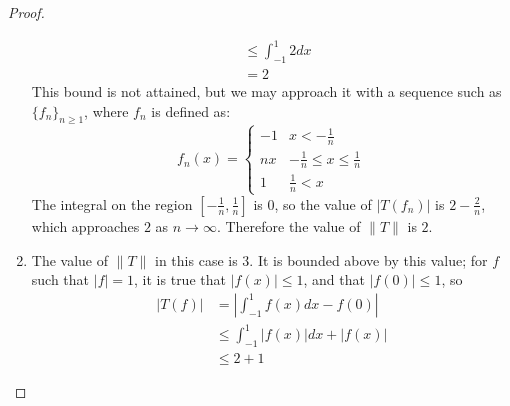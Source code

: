 \documentclass[12pt]{article}
\theoremstyle{definition}
\begin{document}
\begin{proof}
\begin{enumerate}[label=(\roman*)]
\begin{align*}
            &\leq \int_{-1}^1 2dx\\
            &= 2
        \end{align*}
        This bound is not attained, but we may approach it with a sequence such as $\{f_n\}_{n \geq 1}$, where $f_n$ is defined as:
        \[
        f_n(x) = \begin{cases}
        -1 & x < -\frac{1}{n}\\
        nx & -\frac{1}{n} \leq x \leq \frac{1}{n}\\
        1 & \frac{1}{n} < x
        \end{cases}
        \]
	The integral on the region $[-\frac{1}{n}, \frac{1}{n}]$ is $0$, so the value of $\lvert T(f_n) \rvert$ is $2 - \frac{2}{n}$, which approaches $2$ as $n \to \infty$. Therefore the value of $\lVert T \rVert $ is $2$.\
        \item The value of $\lVert T \rVert$ in this case is $3$. It is bounded above by this value; for $f$ such that $\lvert f \rvert = 1$, it is true that $\lvert f(x) \rvert \leq 1$, and that $\lvert f(0) \rvert \leq 1$, so
        \begin{align*}
            \lvert T(f) \rvert &= \left \lvert \int_{-1}^1 f(x)dx - f(0) \right \rvert\\
            &\leq \int_{-1}^1 \lvert f(x)\rvert dx + \lvert f(x) \rvert\\
            &\leq 2 + 1
        \end{align*}
        

\end{enumerate}
\end{proof}
\end{document}
